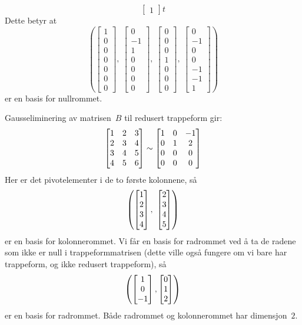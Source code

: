 \begin{losning}
\begin{punkt}
\[\begin{bmatrix}
1
\end{bmatrix}
t
\]
Dette betyr at
\[
\left(
\begin{bmatrix}
1\\
0\\
0\\
0\\
0\\
0\\
0
\end{bmatrix},
\ %
\begin{bmatrix}
0\\
-1\\
1\\
0\\
0\\
0\\
0
\end{bmatrix},
\ %
\begin{bmatrix}
0\\
0\\
0\\
1\\
0\\
0\\
0
\end{bmatrix},
\ %
\begin{bmatrix}
0\\
-1\\
0\\
0\\
-1\\
-1\\
1
\end{bmatrix}
\right)
\]
er en basis for nullrommet.
\end{punkt}

\begin{punkt}
Gausseliminering av matrisen~$B$ til redusert trappeform gir:
\[
\begin{bmatrix}
 1 & 2 & 3\\
 2 & 3 & 4\\
 3 & 4 & 5\\
 4 & 5 & 6
\end{bmatrix}
\sim
\begin{bmatrix}
 1 & 0 & -1 \\
 0 & 1 &  2 \\
 0 & 0 &  0 \\
 0 & 0 &  0
\end{bmatrix}
\]
Her er det pivotelementer i de to første kolonnene,
så
\[
\left(
\vvvv{1}{2}{3}{4},\ %
\vvvv{2}{3}{4}{5}
\right)
\]
er en basis for kolonnerommet.
Vi får en basis for radrommet ved å ta de radene
som ikke er null i trappeformmatrisen
(dette ville også fungere om vi bare har trappeform,
og ikke redusert trappeform), så
\[
\left(
\begin{bmatrix} 1 \\ 0 \\ -1 \end{bmatrix},
\begin{bmatrix} 0 \\ 1 \\ 2 \end{bmatrix}
\right)
\]
er en basis for radrommet.
Både radrommet og kolonnerommet har dimensjon~$2$.


\end{punkt}
\end{losning}
